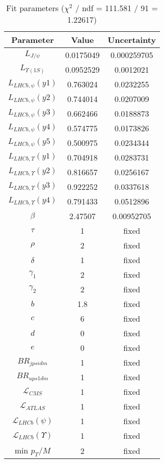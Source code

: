 \begin{table}
\centering
\begin{tabular}{c|c|c}
Parameter & Value & Uncertainty \\
\hline
$L_{J/\psi}$ & 0.0175049 & 0.000259705 \\
$L_{\Upsilon(1S)}$ & 0.0952529 & 0.0012021 \\
$L_{LHCb,\psi}(y1)$ & 0.763024 & 0.0232255 \\
$L_{LHCb,\psi}(y2)$ & 0.744014 & 0.0207009 \\
$L_{LHCb,\psi}(y3)$ & 0.662466 & 0.0188873 \\
$L_{LHCb,\psi}(y4)$ & 0.574775 & 0.0173826 \\
$L_{LHCb,\psi}(y5)$ & 0.500975 & 0.0234344 \\
$L_{LHCb,\Upsilon}(y1)$ & 0.704918 & 0.0283731 \\
$L_{LHCb,\Upsilon}(y2)$ & 0.816657 & 0.0256167 \\
$L_{LHCb,\Upsilon}(y3)$ & 0.922252 & 0.0337618 \\
$L_{LHCb,\Upsilon}(y4)$ & 0.791433 & 0.0512896 \\
$\beta$ & 2.47507 & 0.00952705 \\
$\tau$ & 1 & fixed \\
$\rho$ & 2 & fixed \\
$\delta$ & 1 & fixed \\
$\gamma_1$ & 2 & fixed \\
$\gamma_2$ & 2 & fixed \\
$b$ & 1.8 & fixed \\
$c$ & 6 & fixed \\
$d$ & 0 & fixed \\
$e$ & 0 & fixed \\
$BR_{jpsidm}$ & 1 & fixed \\
$BR_{ups1dm}$ & 1 & fixed \\
$\mathcal L_{CMS}$ & 1 & fixed \\
$\mathcal L_{ATLAS}$ & 1 & fixed \\
$\mathcal L_{LHCb}(\psi)$ & 1 & fixed \\
$\mathcal L_{LHCb}(\Upsilon)$ & 1 & fixed \\
min $p_T/M$ & 2 & fixed \\
\end{tabular}
\caption{Fit parameters ($\chi^2$ / ndf = 111.581 / 91 = 1.22617)}
\end{table}
